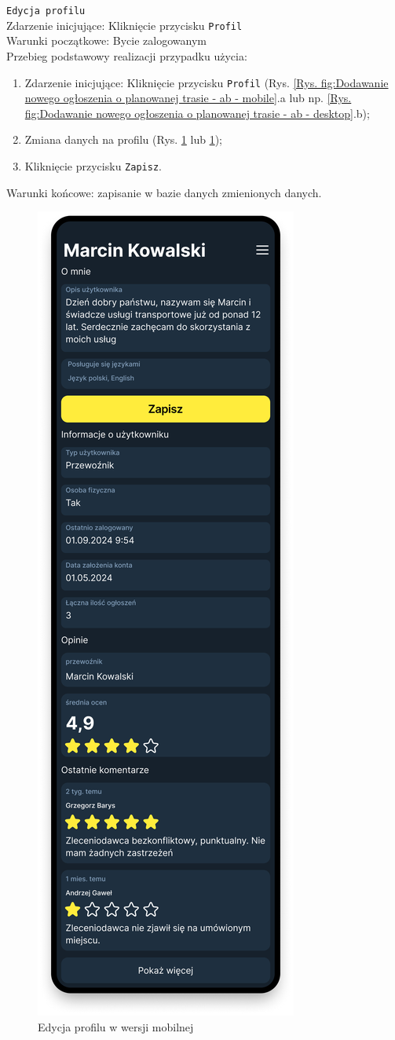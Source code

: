 \pagebreak
\texttt{Edycja profilu} \\
Zdarzenie inicjujące: Kliknięcie przycisku \texttt{Profil} \\
Warunki początkowe: Bycie zalogowanym \\
Przebieg podstawowy realizacji przypadku użycia: \\
\begin{enumerate}
    \item Zdarzenie inicjujące: Kliknięcie przycisku \texttt{Profil} (Rys. \ref{Rys. fig:Dodawanie nowego ogłoszenia o planowanej trasie - ab - mobile}.a lub np. \ref{Rys. fig:Dodawanie nowego ogłoszenia o planowanej trasie - ab - desktop}.b);
    \item Zmiana danych na profilu (Rys. \ref{Edytuj profil - mobile} lub \ref{Edytuj profil - mobile});
    \item Kliknięcie przycisku \texttt{Zapisz}.
\end{enumerate}
Warunki końcowe: zapisanie w bazie danych zmienionych danych. \\
\begin{figure}[H]
	\centering
		\includegraphics[width=0.3\linewidth]{rozdzial1/edytuj_profil_m.png}
	\caption{Edycja profilu w wersji mobilnej}
	\label{Edytuj profil - mobile}
\end{figure}
